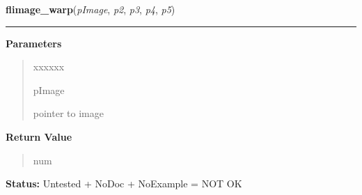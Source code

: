 \hspace{.8\funcindent}\begin{boxedminipage}{\funcwidth}

    \raggedright \textbf{flimage\_warp}(\textit{pImage}, \textit{p2}, \textit{p3}, \textit{p4}, \textit{p5})

    \vspace{-1.5ex}

    \rule{\textwidth}{0.5\fboxrule}
\setlength{\parskip}{2ex}
\setlength{\parskip}{1ex}
      \textbf{Parameters}
      \vspace{-1ex}

      \begin{quote}
        \begin{Ventry}{xxxxxx}

          \item[pImage]

          pointer to image

        \end{Ventry}

      \end{quote}

      \textbf{Return Value}
    \vspace{-1ex}

      \begin{quote}
      num

      \end{quote}

\textbf{Status:} Untested + NoDoc + NoExample = NOT OK



    \end{boxedminipage}

    \label{xformslib:library:flimage_autocrop}

    \vspace{0.5ex}

